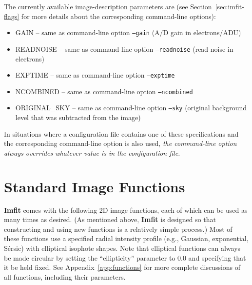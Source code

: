 \documentclass[10pt,a4paper,article]{memoir}
\newcommand{\imfit}{\textbf{Imfit}}
\newcommand{\Imfit}{\textbf{Imfit}}
\begin{document}
The currently available image-description parameters are (see Section~\ref{sec:imfit-flags} for more
details about the corresponding command-line options):
\begin{itemize}
\item GAIN -- same as command-line option \texttt{--gain} (A/D gain in electrons/ADU)
\item READNOISE -- same as command-line option \texttt{--readnoise} (read noise in electrons)
\item EXPTIME -- same as command-line option \texttt{--exptime}
\item NCOMBINED -- same as command-line option \texttt{--ncombined}
\item ORIGINAL\_SKY -- same as command-line option \texttt{--sky} (original
background level that was subtracted from the image)
\end{itemize}

In situations where a configuration file contains one of these specifications
and the corresponding command-line option is also used, \textit{the command-line option
always overrides whatever value is  in the configuration file.}



\chapter{Standard Image Functions}

\Imfit{} comes with the following 2D image functions, each of
which can be used as many times as desired. (As mentioned above, \imfit{}
is designed so that constructing and using new functions is a relatively
simple process.) Most of these functions use a specified radial intensity
profile (e.g., Gaussian, exponential, S{\'e}rsic) with elliptical isophote
shapes. Note that elliptical functions can always be made circular
by setting the ``ellipticity'' parameter to 0.0 and specifying that it be
held fixed. See Appendix~\ref{app:functions} for more complete discussions of all
functions, including their parameters.
\end{document}
